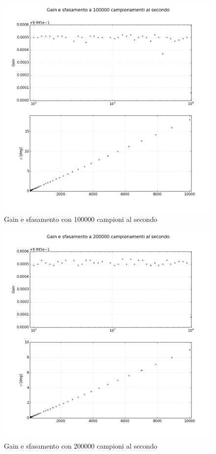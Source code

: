 \begin{frame}
\begin{figure}
\centering
\includegraphics[width=0.9\linewidth]{./subplots_errors_amplitude100000}
\caption{Gain e sfasamento con 100000 campioni al secondo}
\label{fig:sfasamento100000}
\end{figure}
\end{frame}

\begin{frame}
\begin{figure}
\centering
\includegraphics[width=0.9\linewidth]{./subplots_errors_amplitude200000}
\caption{Gain e sfasamento con 200000 campioni al secondo}
\label{fig:sfasamento200000}
\end{figure}
\end{frame}

